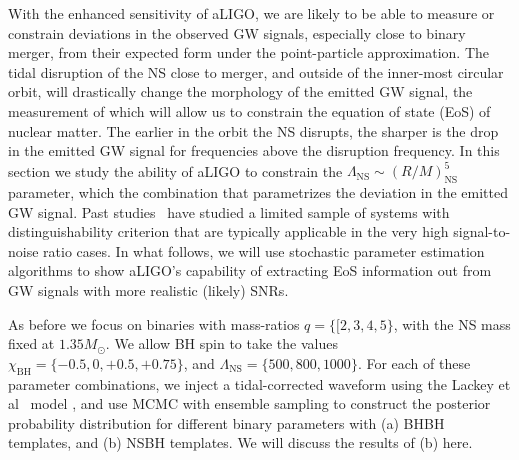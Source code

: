\documentclass[aps,prd,amsmath,floats,floatfix, twocolumn,
superscriptaddress,nofootinbib,showpacs]{revtex4-1}
\newcommand{\lambdans}{\Lambda_\mathrm{NS}}
\newcommand{\chibh}{\chi_\mathrm{BH}}
\begin{document}
With the enhanced sensitivity of aLIGO, we are likely to be able to measure or
constrain deviations in the observed GW signals, especially close to binary
merger, from their expected form under the point-particle approximation.
The tidal disruption of the NS close to merger, and outside of the 
inner-most circular orbit, will drastically change the morphology of the emitted
GW signal, the measurement of which will allow us to constrain the equation 
of state (EoS) of nuclear matter.
The earlier in the orbit the NS disrupts, the sharper is the drop in the emitted
GW signal for frequencies above the disruption frequency. In this section we
study the ability of aLIGO to constrain the 
$\lambdans\sim \left(R/M\right)_\mathrm{NS}^5$ parameter, which
the combination that parametrizes the deviation in the emitted GW signal.
Past studies~\cite{}
have studied a limited sample of systems with distinguishability criterion that
are typically applicable in the very high signal-to-noise ratio cases. 
In what follows, we will use stochastic parameter estimation algorithms to show
aLIGO's capability of extracting EoS information out from GW signals with 
more realistic (likely) SNRs.

As before we focus on binaries with mass-ratios $q=\{[2,3,4,5\}$, with the NS mass
fixed at $1.35M_\odot$. We allow BH spin to take the values 
$\chibh=\{-0.5,0,+0.5,+0.75\}$, and $\lambdans=\{500, 800, 1000\}$. For each of these
parameter combinations, we inject a tidal-corrected waveform using the 
Lackey et al~\cite{} model , and use MCMC with ensemble sampling to construct the 
posterior probability distribution for different binary parameters with (a) BHBH
templates, and (b) NSBH templates. We will discuss the results of (b) here.




\pagebreak
\newpage
\FloatBarrier
\end{document}
